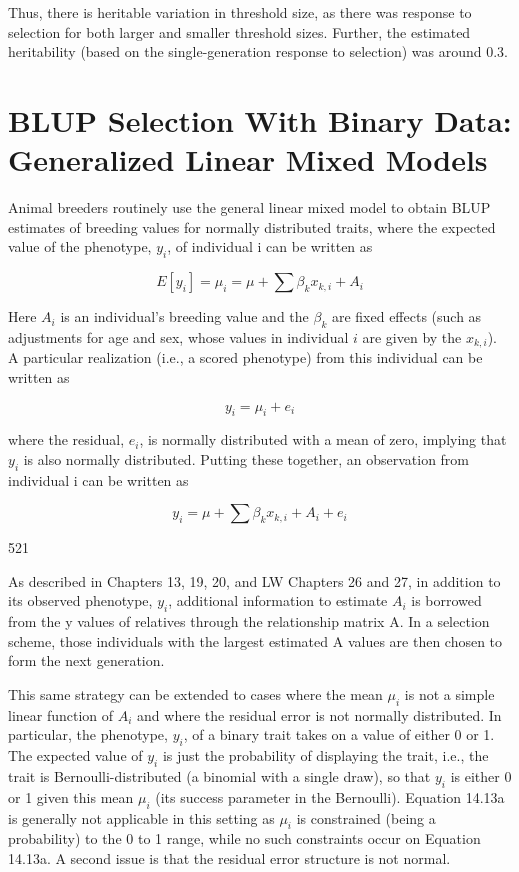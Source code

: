 \documentclass{article}
\begin{document}
Thus, there is heritable variation in threshold size, as there was response to selection for both larger and smaller threshold sizes. Further, the estimated heritability (based on the single-generation response to selection) was around 0.3.

\section{BLUP Selection With Binary Data: Generalized Linear Mixed Models}
Animal breeders routinely use the general linear mixed model to obtain BLUP estimates of breeding values for normally distributed traits, where the expected value of the phenotype,  $ y_{i} $, of individual i can be written as

\begin{equation}
E[y_{i}]=\mu_{i}=\mu+\sum\beta_{k}x_{k,i}+A_{i}
\tag{14.13a}
\label{eq:14_13a}
\end{equation}

Here  $ A_i $ is an individual's breeding value and the  $ \beta_k $ are fixed effects (such as adjustments for age and sex, whose values in individual  $ i $ are given by the  $ x_{k,i} $). A particular realization (i.e., a scored phenotype) from this individual can be written as

\begin{equation}
y_{i}=\mu_{i}+e_{i}
\tag{14.13b}
\label{eq:14_13b}
\end{equation}

where the residual,  $ e_{i} $, is normally distributed with a mean of zero, implying that  $ y_{i} $ is also normally distributed. Putting these together, an observation from individual i can be written as

\begin{equation}
y_{i}=\mu+\sum\beta_{k}x_{k,i}+A_{i}+e_{i}
\tag{14.13c}
\label{eq:14_13c}
\end{equation}

521

As described in Chapters 13, 19, 20, and LW Chapters 26 and 27, in addition to its observed phenotype,  $ y_{i} $, additional information to estimate  $ A_{i} $ is borrowed from the y values of relatives through the relationship matrix A. In a selection scheme, those individuals with the largest estimated A values are then chosen to form the next generation.

This same strategy can be extended to cases where the mean  $ \mu_i $ is not a simple linear function of  $ A_i $ and where the residual error is not normally distributed. In particular, the phenotype,  $ y_i $, of a binary trait takes on a value of either 0 or 1. The expected value of  $ y_i $ is just the probability of displaying the trait, i.e., the trait is Bernoulli-distributed (a binomial with a single draw), so that  $ y_i $ is either 0 or 1 given this mean  $ \mu_i $ (its success parameter in the Bernoulli). Equation 14.13a is generally not applicable in this setting as  $ \mu_i $ is constrained (being a probability) to the 0 to 1 range, while no such constraints occur on Equation 14.13a. A second issue is that the residual error structure is not normal.
\end{document}
